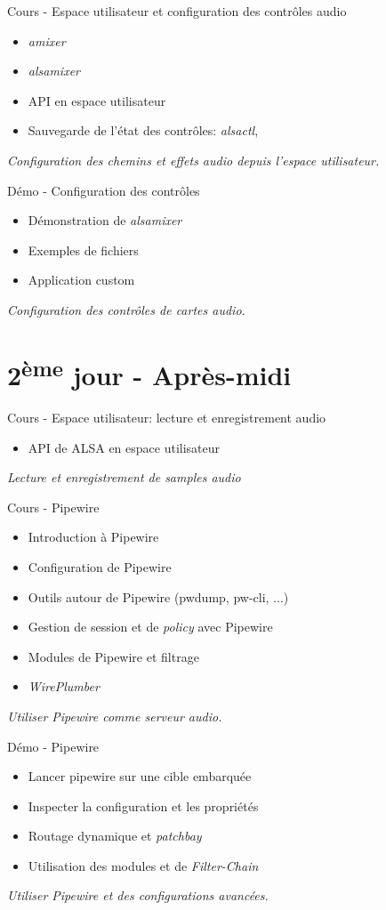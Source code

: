\documentclass[a4paper,12pt,obeyspaces,spaces,hyphens]{article}
\begin{document}
\feagendatwocolumn
{Cours - Espace utilisateur et configuration des contrôles audio}
{
  \begin{itemize}
  \item {\em amixer}
  \item {\em alsamixer}
  \item API en espace utilisateur
  \item Sauvegarde de l'état des contrôles: {\em alsactl}, 
  \end{itemize}
  \vspace{0.5em}
  {\em Configuration des chemins et effets audio depuis l'espace utilisateur.}
}
{Démo - Configuration des contrôles}
{
  \begin{itemize}
  \item Démonstration de {\em alsamixer}
  \item Exemples de fichiers 
  \item Application custom
  \end{itemize}
  \vspace{0.5em}
  {\em Configuration des contrôles de cartes audio.}
}

\section{2\textsuperscript{ème} jour - Après-midi}

\feagendaonecolumn
{Cours - Espace utilisateur: lecture et enregistrement audio}
{
  \begin{itemize}
  \item API de ALSA en espace utilisateur
  \end{itemize}
  \vspace{0.5em}
  {\em Lecture et enregistrement de samples audio}
}

\feagendatwocolumn
{Cours - Pipewire}
{
  \begin{itemize}
  \item Introduction à Pipewire
  \item Configuration de Pipewire
  \item Outils autour de Pipewire (pwdump, pw-cli, ...)
  \item Gestion de session et de {\em policy} avec Pipewire
  \item Modules de Pipewire et filtrage
  \item {\em WirePlumber}
  \end{itemize}
  \vspace{0.5em}
  {\em Utiliser Pipewire comme serveur audio.}
}
{Démo - Pipewire}
{
  \begin{itemize}
  \item Lancer pipewire sur une cible embarquée
  \item Inspecter la configuration et les propriétés
  \item Routage dynamique et {\em patchbay}
  \item Utilisation des modules et de {\em Filter-Chain}
  \end{itemize}
  \vspace{0.5em}
  {\em Utiliser Pipewire et des configurations avancées.}
}
\end{document}
